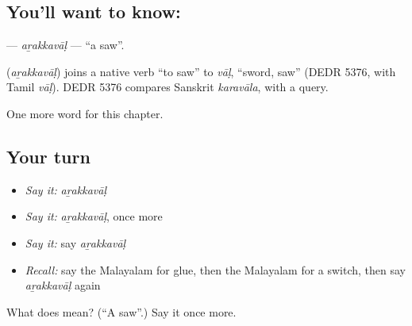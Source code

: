 \subsection*{You'll want to know: }
\textbf{} — \emph{aṟakkavāḷ} — \textquotedblleft{}a saw\textquotedblright{}.

\begin{cousinweb}
\textbf{} (\emph{aṟakkavāḷ}) joins a native verb \textquotedblleft{}to saw\textquotedblright{} to \emph{vāḷ}, \textquotedblleft{}sword, saw\textquotedblright{} (DEDR 5376, with Tamil \emph{vāḷ}). DEDR 5376 compares Sanskrit \emph{karavāla}, with a query.
\end{cousinweb}

\begin{grammarlens}[title={What you've built}]
One more word for this chapter.
\end{grammarlens}

\subsection*{Your turn}
\begin{itemize}
\raggedright
  \item \emph{Say it:} \emph{aṟakkavāḷ}
  \item \emph{Say it:} \emph{aṟakkavāḷ}, once more
  \item \emph{Say it:} say \emph{aṟakkavāḷ}
  \item \emph{Recall:} say the Malayalam for glue, then the Malayalam for a switch, then say \emph{aṟakkavāḷ} again
\end{itemize}

\begin{tcolorbox}[breakable,colback=teal!4,colframe=teal!35!black,title={Before you move on}]
What does  mean? (\textquotedblleft{}A saw\textquotedblright{}.) Say it once more.
\end{tcolorbox}
